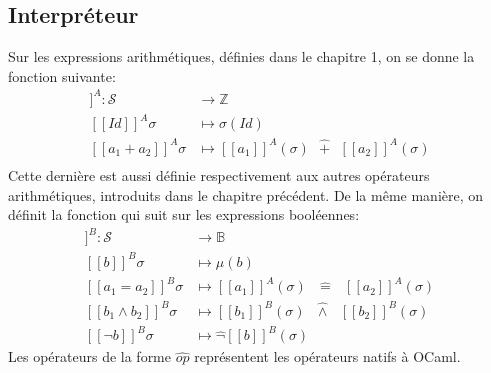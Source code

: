 \subsection{Interpréteur}
Sur les expressions arithmétiques, définies dans le chapitre 1, on se donne la fonction suivante:
\begin{align*}
	[\![Exp_a]\!]^A : \mathcal{S} &\longrightarrow \mathbb{Z}\\
	[\![Id]\!]^A \sigma &\longmapsto \sigma(Id)\\
	[\![a_1+a_2]\!]^A \sigma &\longmapsto [\![a_1]\!]^A(\sigma)\text{ }\hat{+}\text{ }[\![a_2]\!]^A(\sigma)\\
\end{align*}
Cette dernière est aussi définie respectivement aux autres opérateurs arithmétiques, introduits dans le chapitre précédent.
De la même manière, on définit la fonction qui suit sur les expressions booléennes:
\begin{align*}
	[\![Exp_b]\!]^{B} : \mathcal{S} &\longrightarrow \mathbb{B}\\	
	[\![b]\!]^{B} \sigma &\longmapsto \mu(b)\\
	[\![a_1 = a_2]\!]^B \sigma &\longmapsto [\![a_1]\!]^{A}(\sigma)\text{ }\hat{=}\text{ }[\![a_2]\!]^A(\sigma)\\
	[\![b_1 \wedge b_2]\!]^B \sigma &\longmapsto [\![b_1]\!]^B(\sigma)\text{ }\hat{\wedge}\text{ }[\![b_2]\!]^B(\sigma)\\
	[\![\neg b]\!]^B \sigma &\longmapsto \hat{\neg}[\![b]\!]^B(\sigma)
\end{align*}
Les opérateurs de la forme $\hat{op}$ représentent les opérateurs natifs à OCaml.